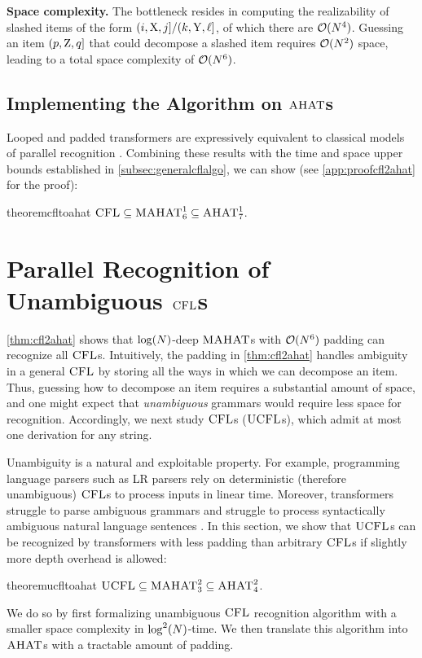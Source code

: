 \documentclass{article}
\begin{document}
\textbf{Space complexity.}
The bottleneck resides in computing the realizability of slashed items of the form $({{ i}}, {{ \mathrm{X}}}, {{ j}}] / ({{ k}}, {{ \mathrm{Y}}}, {{\ell}}]$, of which there are ${{ \mathcal{O}}}( {{ N}}^4)$.
Guessing an item $(p, {{ \mathrm{Z}}}, q]$ that could decompose a slashed item requires ${{ \mathcal{O}}}({{ N}}^2)$ space, leading to a total space complexity of ${{ \mathcal{O}}}({{ N}}^6)$.

\subsection{Implementing the Algorithm on ${{\textsc{AHAT}}}$s}\label{subsec:cfl-ahat-impl}
Looped and padded transformers are expressively equivalent to classical models of parallel recognition \citep{merrill2025exactexpressivepowertransformers,anonymous2026revisiting}.
Combining these results with the time and space upper bounds established in \cref{subsec:generalcflalgo}, we can show (see \cref{app:proofcfl2ahat} for the proof):
\begin{restatable}{theorem}{cfltoahat}\label{thm:cfl2ahat} 
    ${\textsc{CFL}} \subseteq {{\textsc{MAHAT}}}^{1}_{6} \subseteq {{\textsc{AHAT}}}^{1}_{7}$.
\end{restatable}


\section{Parallel Recognition of Unambiguous ${\textsc{CFL}}$s}\label{sec:subclasses}

\cref{thm:cfl2ahat} shows that $\log({{ N}})$-deep  ${{\textsc{MAHAT}}}$s with ${{ \mathcal{O}}}({{ N}}^6)$ padding can recognize all ${\textsc{CFL}}$s.
Intuitively, the padding in \cref{thm:cfl2ahat} handles ambiguity in a general ${\textsc{CFL}}$ by storing all the ways in which we can decompose an item. 
Thus, guessing how to decompose an item requires a substantial amount of space, and one might expect that \emph{unambiguous} grammars would require less space for recognition.
Accordingly, we next study  ${\textsc{CFL}}$s (${\textsc{UCFL}}$s), which admit at most one derivation for any string.

Unambiguity is a natural and exploitable property.
For example, programming language parsers such as \textsc{LR} parsers rely on deterministic (therefore unambiguous) ${\textsc{CFL}}$s to process inputs in linear time.
Moreover, transformers struggle to parse ambiguous grammars  \citep{khalighinejad-etal-2023-approximating} and struggle to process syntactically ambiguous natural language sentences \citep{liu2023wereafraidlanguagemodels}. 
In this section, we show that ${\textsc{UCFL}}$s can be recognized by transformers with less padding than arbitrary ${\textsc{CFL}}$s if slightly more depth overhead is allowed:
\begin{restatable}{theorem}{ucfltoahat}\label{thm:ucfl2ahat}
    ${\textsc{UCFL}} \subseteq {{\textsc{MAHAT}}}^{2}_{3} \subseteq {{\textsc{AHAT}}}^2_4$.
\end{restatable}
We do so by first formalizing  unambiguous ${\textsc{CFL}}$ recognition algorithm with a smaller space complexity in $\log^2({{ N}})$-time. 
We then translate this algorithm into ${{\textsc{AHAT}}}$s with a tractable amount of padding.
\end{document}
